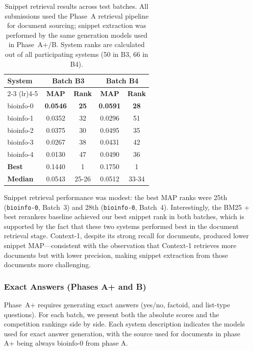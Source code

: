 \begin{table}[ht]
  \centering
  \caption{Snippet retrieval results across test batches. All submissions used the Phase~A retrieval pipeline for document sourcing; snippet extraction was performed by the same generation models used in Phase~A+/B. System ranks are calculated out of all participating systems (50 in B3, 66 in B4).}
  \label{tab:snippets}
  \footnotesize
  \begin{tabular}{lcccc}
    \toprule
    \multirow{2}{*}{\textbf{System}} & \multicolumn{2}{c}{\textbf{Batch B3}} & \multicolumn{2}{c}{\textbf{Batch B4}} \\
    \cmidrule(lr){2-3} \cmidrule(lr){4-5}
    & \textbf{MAP} & \textbf{Rank} & \textbf{MAP} & \textbf{Rank} \\
    \midrule
    bioinfo-0 & \textbf{0.0546} & \textbf{25} & \textbf{0.0591} & \textbf{28} \\
    bioinfo-1 & 0.0352 & 32 & 0.0296 & 51 \\
    bioinfo-2 & 0.0375 & 30 & 0.0495 & 35 \\
    bioinfo-3 & 0.0267 & 38 & 0.0431 & 42 \\
    bioinfo-4 & 0.0130 & 47 & 0.0490 & 36 \\
    \midrule
    \textbf{Best}   & 0.1440 & 1 & 0.1750 & 1 \\
    \textbf{Median} & 0.0543 & 25-26 & 0.0512 & 33-34 \\
    \bottomrule
  \end{tabular}
\end{table}

Snippet retrieval performance was modest: the best MAP ranks were 25th (\texttt{bioinfo-0}, Batch~3) and 28th (\texttt{bioinfo-0}, Batch~4). Interestingly, the BM25 + best rerankers baseline achieved our best snippet rank in both batches, which is supported by the fact that these two systems performed best in the document retrieval stage. Context-1, despite its strong recall for documents, produced lower snippet MAP---consistent with the observation that Context-1 retrieves more documents but with lower precision, making snippet extraction from those documents more challenging.

\subsubsection{Exact Answers (Phases A+ and B)}
\label{sec:results-phase-aplus}

Phase~A+ requires generating exact answers (yes/no, factoid, and list-type questions). For each batch, we present both the absolute scores and the competition rankings side by side. Each system description indicates the models used for exact answer generation, with the source used for documents in phase A+ being always bioinfo-0 from phase A.

